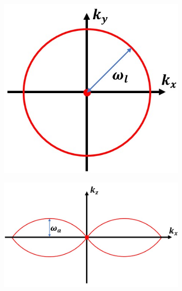\begin{figure}[h]
	\centering
	\begin{subfigure}[t]{0.25\textwidth}
		\centering
		\includegraphics[width=\linewidth]{images/3D_SIM_OTF_no_angle_2D_plot_xy_k_l.jpg}
		\caption{}
		\label{fig:WF_OTF_xy}
	\end{subfigure}
	\begin{subfigure}[t]{0.435\textwidth}
		\centering
		\includegraphics[width=\linewidth]{images/3D_SIM_OTF_no_angle_2D_plot_xz_k_a.jpg}
		\caption{}
		\label{fig:WF_OTF_xz}
	\end{subfigure}
	\begin{subfigure}[t]{0.25\textwidth}

\end{subfigure}
\end{figure}
